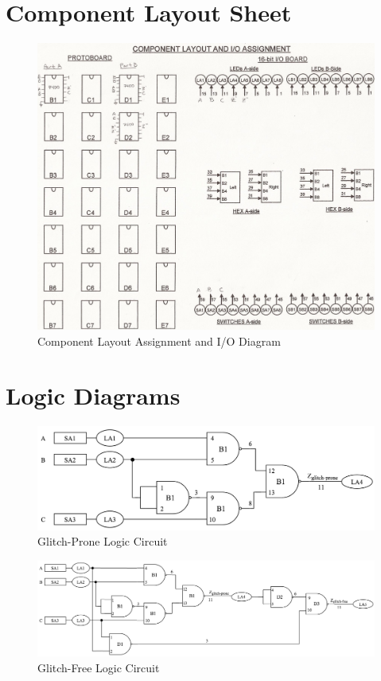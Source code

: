 \documentclass{scrartcl}
\begin{document}
\section{Component Layout Sheet}
	\begin{figure} [H]
		\centering
		\includegraphics[scale = 0.2]{Layout_Diagram.jpeg}
		\caption{Component Layout Assignment and I/O Diagram}
		\label{fig:layout-diagram}
	\end{figure}

\section{Logic Diagrams}
	\begin{figure} [H]
		\centering
		\includegraphics[scale = 0.5]{Glitch-Prone.png}
		\caption{Glitch-Prone Logic Circuit}
		\label{fig:glitch-prone}
	\end{figure}
	
	\begin{figure} [H]
		\includegraphics[width=\linewidth]{Glitch-Free-Circuit.png}
		\caption{Glitch-Free Logic Circuit}
		\label{fig:glitch-free}
	\end{figure}
\end{document}

